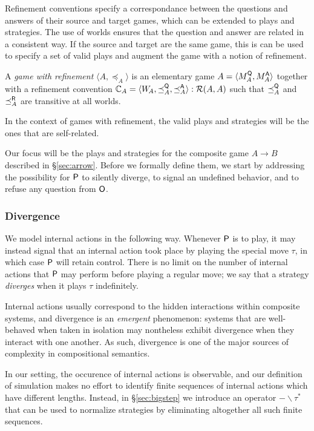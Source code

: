 Refinement conventions specify a correspondance
between the questions and answers of their source and target games,
which can be extended to plays and strategies.
The use of worlds ensures that the question and answer
are related in a consistent way.
If the source and target are the same game,
this is can be used to specify a set of valid plays
and augment the game with a notion of refinement.

\begin{definition} %
A \emph{game with refinement} $\langle A, \preceq_A \rangle$
is an elementary game
$A = \langle M_A^{ \mathsf{Q} }, M_A^{ \mathsf{A} } \rangle$
together with a refinement convention
$\mathbb{C}_A = \langle W_{\!A}, {\preceq}_A^{ \mathsf{Q} }, {\preceq}_A^{ \mathsf{A} } \rangle
  : \mathcal{R}(A, A)$
such that $\preceq_A^{ \mathsf{Q} }$ and $\preceq_A^{ \mathsf{R} }$
are transitive at all worlds.
\end{definition}

In the context of games with refinement,
the valid plays and strategies will be the ones
that are self-related.

Our focus will be the plays and strategies
for the composite game $A \rightarrow B$
described in \S\ref{sec:arrow}.
Before we formally define them,
we start by addressing
the possibility for $ \mathsf{P} $ to silently diverge,
to signal an undefined behavior,
and to refuse any question from $ \mathsf{O} $.


\subsubsection{Divergence} %

We model internal actions in the following way.
Whenever $ \mathsf{P} $ is to play,
it may instead signal that an internal action took place
by playing the special move $\tau$,
in which case $ \mathsf{P} $ will retain control.
There is no limit on the number of internal actions that
$ \mathsf{P} $ may perform before playing a regular move;
we say that a strategy \emph{diverges}
when it plays $\tau$ indefinitely.

Internal actions usually correspond to the hidden interactions
within composite systems, and
divergence is an \emph{emergent} phenomenon:
systems that are well-behaved when taken in isolation
may nontheless exhibit divergence when they interact with one another.
As such,
divergence is one of the major sources of complexity
in compositional semantics.

In our setting,
the occurence of internal actions
is observable,
and our definition of simulation
makes no effort
to identify finite sequences of internal actions
which have different lengths.
Instead,
in \S\ref{sec:bigstep}
we introduce an operator $- \backslash \tau^*$
that can be used to normalize strategies
by eliminating altogether all such finite sequences.

